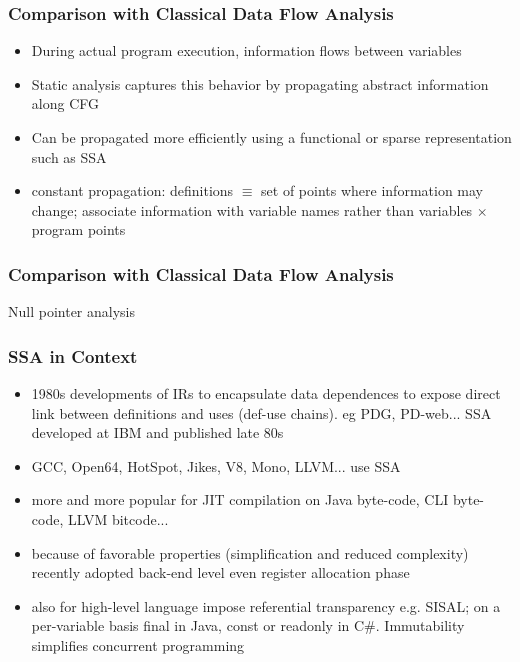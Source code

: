 \begin{frame}
\frametitle{Comparison with Classical Data Flow Analysis}
\begin{itemize}
\item During actual program execution, information flows between variables
\item Static analysis captures this behavior by propagating abstract information along CFG
\item Can be propagated more efficiently using a functional or sparse representation such as SSA
\item constant propagation: definitions $\equiv$ set of points where information may change; associate information with variable names rather than variables $\times$ program points
\end{itemize}
\end{frame}

\begin{frame}
\frametitle{Comparison with Classical Data Flow Analysis}
\begin{block}{Null pointer analysis}
\end{block}
\end{frame}

\begin{frame}
\frametitle{SSA in Context}
\begin{itemize} 
\item 1980s developments of IRs to encapsulate data dependences to expose direct link between definitions and uses (def-use chains). eg PDG, PD-web... SSA developed at IBM and published late 80s
\item GCC, Open64, HotSpot, Jikes, V8, Mono, LLVM... use SSA
\item more and more popular for JIT compilation on Java byte-code, CLI byte-code, LLVM bitcode...
\item because of favorable properties (simplification and reduced complexity) recently adopted back-end level even register allocation phase
\item also for high-level language impose referential transparency e.g. SISAL; on a per-variable basis final in Java, const or readonly in C\#. Immutability simplifies concurrent programming  
\end{itemize}
\end{frame}

